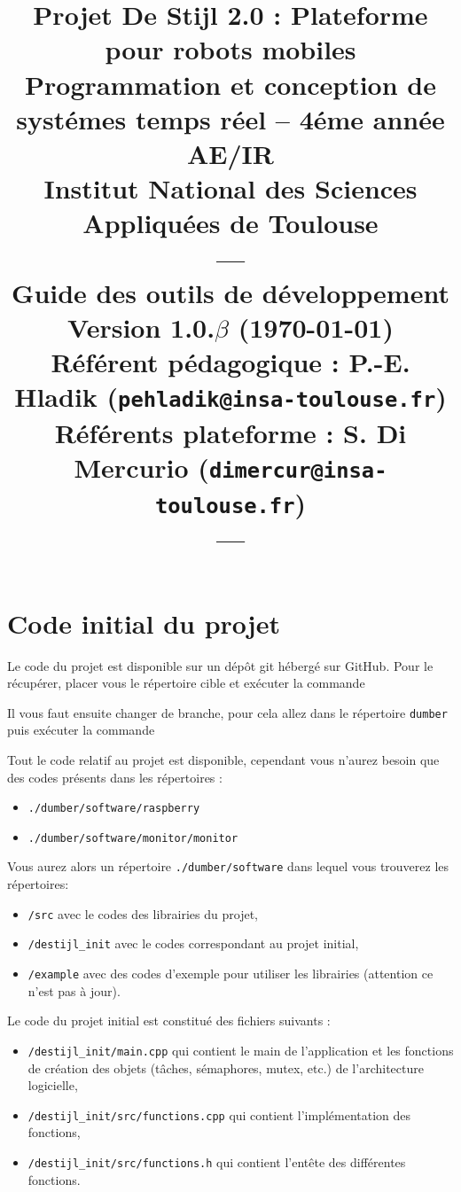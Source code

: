 \documentclass[11pt]{paper}
\title{{\Huge Projet De Stijl 2.0}
{\small : Plateforme pour robots mobiles}\\
{\scriptsize Programmation et conception de systémes temps réel -- 4éme année AE/IR}\\
{\scriptsize Institut National des Sciences Appliquées de Toulouse}\\
---\\
Guide des outils de développement \\
{\large Version 1.0.$\beta$ (\today)}\\
{\scriptsize Référent pédagogique : P.-E. Hladik (\texttt{pehladik@insa-toulouse.fr})}\\
{\scriptsize Référents plateforme : S. Di Mercurio (\texttt{dimercur@insa-toulouse.fr})}\\
---
}
\begin{document}
\maketitle

\section{Code initial du projet}
\label{sec:git}

Le code du projet est disponible sur un dépôt git hébergé sur GitHub. Pour le récupérer, placer vous le répertoire cible et exécuter la commande\\ \indent{}

Il vous faut ensuite changer de branche, pour cela allez dans le répertoire {\tt dumber} puis exécuter la commande\\ \indent{}
 
Tout le code relatif au projet est disponible, cependant vous n'aurez besoin que des codes présents dans les répertoires :
\begin{itemize}
	\item {\tt ./dumber/software/raspberry}
	\item {\tt ./dumber/software/monitor/monitor}
\end{itemize}

  
 Vous aurez alors un répertoire {\tt ./dumber/software} dans lequel vous trouverez les répertoires:
 \begin{itemize}
\item {\tt /src} avec le codes des librairies du projet,
\item {\tt /destijl\_init} avec le codes correspondant au projet initial,
\item {\tt /example} avec des codes d'exemple pour utiliser les librairies (attention ce n'est pas à jour).\\
\end{itemize}


Le code du projet initial est constitué des fichiers suivants :
\begin{itemize}
\item {\tt /destijl\_init/main.cpp} qui contient le main de l'application et les fonctions de création des objets (tâches, sémaphores, mutex, etc.) de l'architecture logicielle,
\item {\tt /destijl\_init/src/functions.cpp} qui contient l'implémentation des fonctions,
\item {\tt /destijl\_init/src/functions.h} qui contient l'entête des différentes fonctions.\\
\end{itemize}
\end{document}
